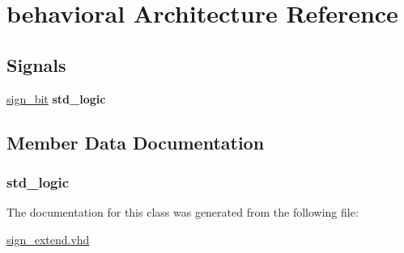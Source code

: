 \hypertarget{classsign__extend_1_1behavioral}{\section{behavioral \-Architecture \-Reference}
\label{classsign__extend_1_1behavioral}
}
\*
\*
\subsection*{\-Signals}
 \begin{DoxyCompactItemize}
\item 
\hyperlink{classsign__extend_1_1behavioral_a520b8edd2c9685b52feb4cac819127d2}{sign\-\_\-bit} {\bfseries std\-\_\-logic } 
\end{DoxyCompactItemize}


\subsection{\-Member \-Data \-Documentation}
\hypertarget{classsign__extend_1_1behavioral_a520b8edd2c9685b52feb4cac819127d2}{
\subsubsection[{sign\-\_\-bit}]{ {\bfseries std\-\_\-logic } }}\label{classsign__extend_1_1behavioral_a520b8edd2c9685b52feb4cac819127d2}


\-The documentation for this class was generated from the following file\-:\begin{DoxyCompactItemize}
\item 
\hyperlink{sign__extend_8vhd}{sign\-\_\-extend.\-vhd}\end{DoxyCompactItemize}
